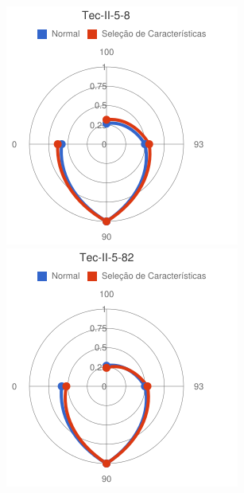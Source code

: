 \begin{figure}
\begin{minipage}{.3\textwidth}
\end{minipage} %
\begin{minipage}{.3\textwidth}
  \centering
  \includegraphics[width=\linewidth]{img/red-ufes-moodle/image15.png}
\end{minipage}
\begin{minipage}{.3\textwidth}
  \centering
  \includegraphics[width=\linewidth]{img/red-ufes-moodle/image16.png}

\end{minipage}
\end{figure}

